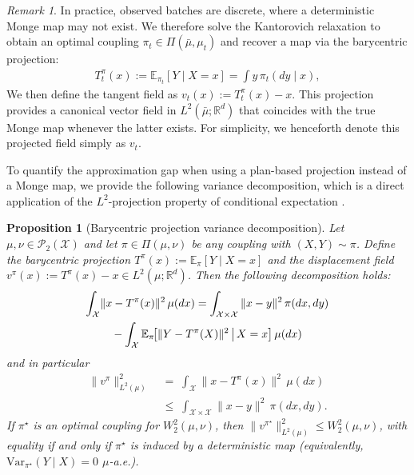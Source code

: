 \documentclass{article}
\newcommand{\rev}[1]{\textcolor{black}{#1}}
\theoremstyle{plain}
\newtheorem{proposition}[theorem]{Proposition}
\theoremstyle{definition}
\theoremstyle{remark}
\newtheorem{remark}[theorem]{Remark}
\begin{document}
\begin{remark}\label{rem:plan}
In practice, observed batches are discrete, where a deterministic Monge map may not exist. 
We therefore solve the Kantorovich relaxation to obtain an optimal coupling $\pi_t \in \Pi(\bar{\mu}, \mu_t)$ and recover a map via the barycentric projection:
\begin{align}
    T_t^{\pi}(x) := \mathbb{E}_{\pi_t}[Y \mid X=x] = \int y \, \pi_t(dy\mid x),
\end{align}
We then define the tangent field as $v_t(x) := T_t^{\pi}(x) - x$. 
This projection provides a canonical vector field in $L^2(\bar{\mu}; \mathbb{R}^d)$ that coincides with the true Monge map whenever the latter exists. 
For simplicity, we henceforth denote this projected field simply as $v_t$.
\end{remark}

To quantify the approximation gap when using a plan-based projection instead of a Monge map, we provide the following variance decomposition, which is a direct application of the $L^2$-projection property of conditional expectation \citep{doob1953stochastic,villani2021topics}.

\begin{proposition}[Barycentric projection variance decomposition]\label{prop:baryproj_gap}
Let $\mu,\nu\in\mathcal P_2(\mathcal X)$ and let $\pi\in\Pi(\mu,\nu)$ be any coupling with $(X,Y)\sim\pi$.
Define the barycentric projection $T^{\pi}(x):=\mathbb E_{\pi}[Y\mid X=x]$ and the displacement field $v^{\pi}(x):=T^{\pi}(x)-x\in L^2(\mu;\mathbb R^d)$.
Then the following decomposition holds:
\begin{align}
  \int_{\mathcal X}&\|x-T^{\pi}(x)\|^2\,\mu(dx)
  = \int_{\mathcal X\times\mathcal X}\|x-y\|^2\,\pi(dx,dy) \notag \\
  &\quad - \int_{\mathcal X}\mathbb E_{\pi}\!\big[\|Y-T^{\pi}(X)\|^2 \,\big|\, X=x\big]\,\mu(dx) 
  \label{eq:baryproj_decomp}
\end{align}
and in particular
\begin{align}\label{eq:baryproj_contraction}
\|v^{\pi}\|_{L^2(\mu)}^2
\;&=\;
\int_{\mathcal X}\|x-T^{\pi}(x)\|^2\,\mu(dx)\\
\;&\le\;
\int_{\mathcal X\times\mathcal X}\|x-y\|^2\,\pi(dx,dy).
\end{align}
If $\pi^\star$ is an optimal coupling for $W_2^2(\mu,\nu)$, then $\|v^{\pi^\star}\|_{L^2(\mu)}^2\le W_2^2(\mu,\nu)$, with equality if and only if $\pi^\star$ is induced by a deterministic map (equivalently, $\mathrm{Var}_{\pi^\star}(Y\mid X)=0$ $\mu$-a.e.).
\end{proposition}
\end{document}
